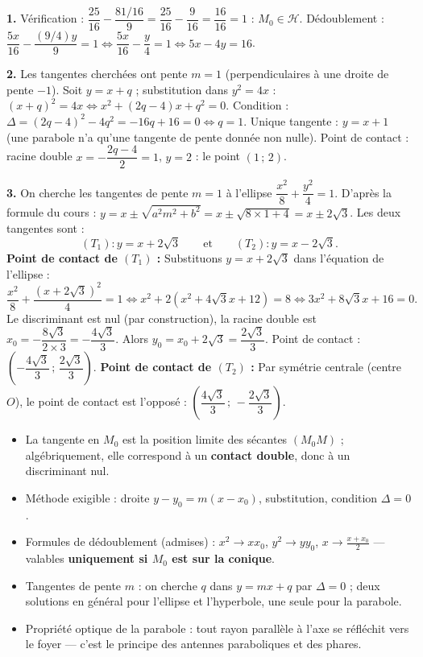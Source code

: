 \documentclass[11pt]{article}
\begin{document}
\begin{corrige}[Exercice n°1]
\textbf{1.} Vérification : $\dfrac{25}{16} - \dfrac{81/16}{9} = \dfrac{25}{16} - \dfrac{9}{16} = \dfrac{16}{16} = 1$ : $M_0 \in \mathcal{H}$. Dédoublement : $\dfrac{5x}{16} - \dfrac{(9/4)y}{9} = 1 \iff \dfrac{5x}{16} - \dfrac{y}{4} = 1 \iff 5x - 4y = 16$.

\textbf{2.} Les tangentes cherchées ont pente $m = 1$ (perpendiculaires à une droite de pente $-1$). Soit $y = x + q$ ; substitution dans $y^2 = 4x$ : $(x+q)^2 = 4x \iff x^2 + (2q - 4)x + q^2 = 0$. Condition : $\Delta = (2q-4)^2 - 4q^2 = -16q + 16 = 0 \iff q = 1$. Unique tangente : $y = x + 1$ (une parabole n'a qu'une tangente de pente donnée non nulle). Point de contact : racine double $x = -\dfrac{2q-4}{2} = 1$, $y = 2$ : le point $(1\,;\,2)$.

\textbf{3.} On cherche les tangentes de pente $m=1$ à l'ellipse $\dfrac{x^2}{8} + \dfrac{y^2}{4} = 1$. D'après la formule du cours : $y = x \pm \sqrt{a^2m^2 + b^2} = x \pm \sqrt{8 \times 1 + 4} = x \pm 2\sqrt{3}$.
Les deux tangentes sont :
\[ (T_1) : y = x + 2\sqrt{3} \qquad \text{et} \qquad (T_2) : y = x - 2\sqrt{3}. \]
\textbf{Point de contact de $(T_1)$ :} Substituons $y = x + 2\sqrt{3}$ dans l'équation de l'ellipse :
\[ \frac{x^2}{8} + \frac{(x+2\sqrt{3})^2}{4} = 1 \iff x^2 + 2(x^2 + 4\sqrt{3}x + 12) = 8 \iff 3x^2 + 8\sqrt{3}x + 16 = 0. \]
Le discriminant est nul (par construction), la racine double est $x_0 = -\dfrac{8\sqrt{3}}{2 \times 3} = -\dfrac{4\sqrt{3}}{3}$.
Alors $y_0 = x_0 + 2\sqrt{3} = \dfrac{2\sqrt{3}}{3}$. Point de contact : $\left(-\dfrac{4\sqrt{3}}{3}\,;\,\dfrac{2\sqrt{3}}{3}\right)$.
\textbf{Point de contact de $(T_2)$ :} Par symétrie centrale (centre $O$), le point de contact est l'opposé : $\left(\dfrac{4\sqrt{3}}{3}\,;\,-\dfrac{2\sqrt{3}}{3}\right)$.
\end{corrige}

\begin{aretenir}
\begin{itemize}
\item La tangente en $M_0$ est la position limite des sécantes $(M_0M)$ ; algébriquement, elle correspond à un \textbf{contact double}, donc à un discriminant nul.
\item Méthode exigible : droite $y - y_0 = m(x - x_0)$, substitution, condition $\Delta = 0$.
\item Formules de dédoublement (admises) : $x^2 \to xx_0$, $y^2 \to yy_0$, $x \to \frac{x+x_0}{2}$ — valables \textbf{uniquement si $M_0$ est sur la conique}.
\item Tangentes de pente $m$ : on cherche $q$ dans $y = mx + q$ par $\Delta = 0$ ; deux solutions en général pour l'ellipse et l'hyperbole, une seule pour la parabole.
\item Propriété optique de la parabole : tout rayon parallèle à l'axe se réfléchit vers le foyer — c'est le principe des antennes paraboliques et des phares.
\end{itemize}
\end{aretenir}
\end{document}

